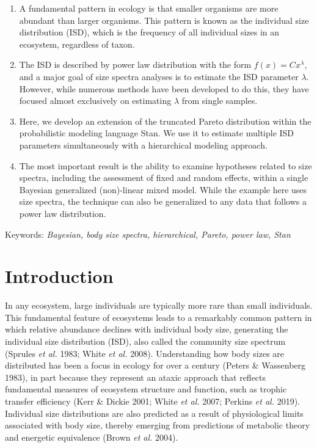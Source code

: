 \documentclass[
  12pt,
]{article}
\providecommand{\tightlist}{%
  \setlength{\itemsep}{0pt}\setlength{\parskip}{0pt}}
\begin{document}
\begin{enumerate}
\def\labelenumi{\arabic{enumi}.}
\tightlist
\item
  A fundamental pattern in ecology is that smaller organisms are more
  abundant than larger organisms. This pattern is known as the
  individual size distribution (ISD), which is the frequency of all
  individual sizes in an ecosystem, regardless of taxon.
\item
  The ISD is described by power law distribution with the form
  \(f(x) = Cx^{\lambda}\), and a major goal of size spectra analyses is
  to estimate the ISD parameter \(\lambda\). However, while numerous
  methods have been developed to do this, they have focused almost
  exclusively on estimating \(\lambda\) from single samples.
\item
  Here, we develop an extension of the truncated Pareto distribution
  within the probabilistic modeling language Stan. We use it to estimate
  multiple ISD parameters simultaneously with a hierarchical modeling
  approach.
\item
  The most important result is the ability to examine hypotheses related
  to size spectra, including the assessment of fixed and random effects,
  within a single Bayesian generalized (non)-linear mixed model. While
  the example here uses size spectra, the technique can also be
  generalized to any data that follows a power law distribution.
\end{enumerate}

Keywords: \emph{Bayesian, body size spectra, hierarchical, Pareto, power
law, Stan}

\newpage

\hypertarget{introduction}{%
\section{Introduction}\label{introduction}}

In any ecosystem, large individuals are typically more rare than small
individuals. This fundamental feature of ecosystems leads to a
remarkably common pattern in which relative abundance declines with
individual body size, generating the individual size distribution (ISD),
also called the community size spectrum (Sprules \emph{et al.} 1983;
White \emph{et al.} 2008). Understanding how body sizes are distributed
has been a focus in ecology for over a century (Peters \& Wassenberg
1983), in part because they represent an ataxic approach that reflects
fundamental measures of ecosystem structure and function, such as
trophic transfer efficiency (Kerr \& Dickie 2001; White \emph{et al.}
2007; Perkins \emph{et al.} 2019). Individual size distributions are
also predicted as a result of physiological limits associated with body
size, thereby emerging from predictions of metabolic theory and
energetic equivalence (Brown \emph{et al.} 2004).
\end{document}

